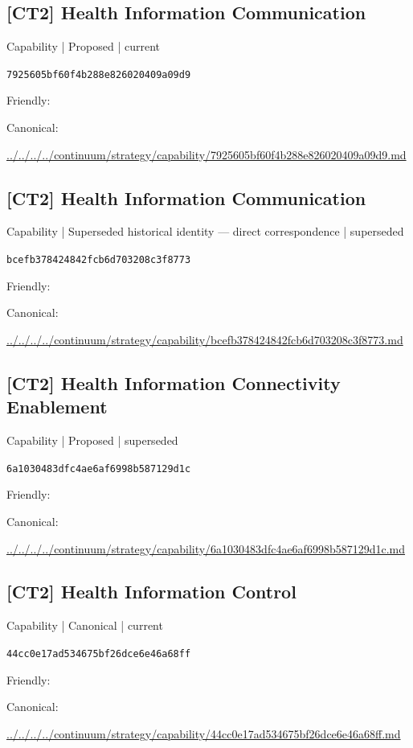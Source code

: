 \documentclass[10pt,a4paper]{article}
\begin{document}
\subsection*{[CT2] Health Information Communication}
{\small Capability | Proposed | current}\par
\texttt{7925605bf60f4b288e826020409a09d9}\par
Friendly: \par
Canonical: \par
{\footnotesize\url{../../../../continuum/strategy/capability/7925605bf60f4b288e826020409a09d9.md}}\par
\subsection*{[CT2] Health Information Communication}
{\small Capability | Superseded historical identity — direct correspondence | superseded}\par
\texttt{bcefb378424842fcb6d703208c3f8773}\par
Friendly: \par
Canonical: \par
{\footnotesize\url{../../../../continuum/strategy/capability/bcefb378424842fcb6d703208c3f8773.md}}\par
\subsection*{[CT2] Health Information Connectivity Enablement}
{\small Capability | Proposed | superseded}\par
\texttt{6a1030483dfc4ae6af6998b587129d1c}\par
Friendly: \par
Canonical: \par
{\footnotesize\url{../../../../continuum/strategy/capability/6a1030483dfc4ae6af6998b587129d1c.md}}\par
\subsection*{[CT2] Health Information Control}
{\small Capability | Canonical | current}\par
\texttt{44cc0e17ad534675bf26dce6e46a68ff}\par
Friendly: \par
Canonical: \par
{\footnotesize\url{../../../../continuum/strategy/capability/44cc0e17ad534675bf26dce6e46a68ff.md}}\par
\end{document}
